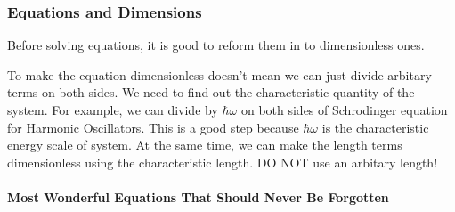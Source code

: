 \documentclass[letterpaper,10pt,english]{sphinxmanual}
\begin{document}
\subsubsection{Equations and Dimensions}
\label{Basic:equations-and-dimensions}
Before solving equations, it is good to reform them in to dimensionless ones.

To make the equation dimensionless doesn't mean we can just divide arbitary terms on both sides. We need to find out the characteristic quantity of the system. For example, we can divide by $\hbar\omega$ on both sides of Schrodinger equation for Harmonic Oscillators. This is a good step because $\hbar\omega$ is the characteristic energy scale of system. At the same time, we can make the length terms dimensionless using the characteristic length. DO NOT use an arbitary length!


\paragraph{Most Wonderful Equations That Should Never Be Forgotten}
\label{Basic:most-wonderful-equations-that-should-never-be-forgotten}
\end{document}
